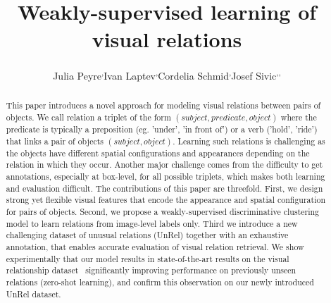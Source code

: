 \documentclass[10pt,twocolumn,letterpaper]{article}
\begin{document}
\title{Weakly-supervised learning of visual relations}

\author{Julia Peyre\footnotemark[1] \textsuperscript{,}\footnotemark[2]
 \qquad Ivan Laptev\footnotemark[1] \textsuperscript{,}\footnotemark[2] \qquad Cordelia Schmid\footnotemark[2] \textsuperscript{,}\footnotemark[4] \qquad Josef Sivic\footnotemark[1] \textsuperscript{,}\footnotemark[2] \textsuperscript{,}\footnotemark[3] \\
}


\maketitle


\begin{abstract}

This paper introduces a novel approach for modeling visual relations
        between pairs of objects.
 We call relation a triplet of the form $(subject,
        predicate, object)$ where the predicate is typically a
        preposition (eg. 'under', 'in front of') or a verb ('hold',
        'ride') that links a pair of objects $(subject,
        object)$. Learning such relations is challenging as the
        objects have different spatial configurations and appearances
        depending on the relation in which they occur. Another major
        challenge comes from the difficulty to get annotations,
        especially at box-level, for all possible triplets, which
        makes both learning and evaluation difficult. The
        contributions of this paper are threefold. First, we design strong yet flexible visual features that 		encode the appearance and spatial configuration for pairs of objects. Second, we propose a
        weakly-supervised discriminative clustering model to learn
        relations from image-level labels only. Third we introduce a
        new challenging dataset of unusual relations (UnRel) together
        with an exhaustive annotation, that enables accurate
        evaluation of visual relation retrieval. We show
        experimentally that our model results in state-of-the-art
        results on the visual relationship dataset~\cite{Lu16}
        significantly improving performance on previously
        unseen relations (zero-shot learning), and confirm this
        observation on our newly introduced UnRel dataset.    
   
\end{abstract}
\end{document}
